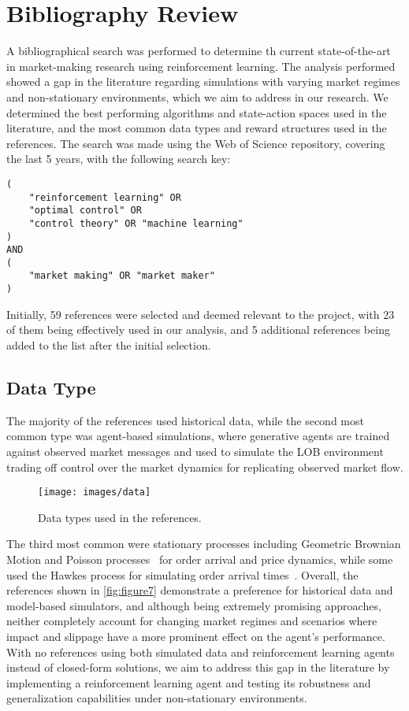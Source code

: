 \section{Bibliography Review}
\label{sec:bibliography-review}

A bibliographical search was performed to determine th current state-of-the-art in market-making research using reinforcement learning.
The analysis performed showed a gap in the literature regarding simulations with varying market regimes and non-stationary environments,
which we aim to address in our research.
We determined the best performing algorithms and state-action spaces used in the literature,
and the most common data types and reward structures used in the references.
The search was made using the Web of Science repository, covering the last 5 years, with the following search key:

\small
\begin{verbatim}
(
    "reinforcement learning" OR
    "optimal control" OR
    "control theory" OR "machine learning"
)
AND
(
    "market making" OR "market maker"
)
\end{verbatim}

Initially, 59 references were selected and deemed relevant to the project,
with 23 of them being effectively used in our analysis, and 5 additional references being added to the list after the initial selection.

\subsection{Data Type}
\label{subsec:data-type}
The majority of the references used historical data, while the second most common type was agent-based simulations,
where generative agents are trained against observed market messages and used to simulate the LOB environment~\cite{Frey2023, Ganesh2019}
trading off control over the market dynamics for replicating observed market flow.

\begin{figure}
    \centering
    \texttt{[image: images/data]}
    \caption{Data types used in the references.}
    \label{fig:figure7}
\end{figure}

The third most common were stationary processes including Geometric Brownian Motion and Poisson processes~\cite{Gasperov2021, Sun2022} for
order arrival and price dynamics, while some used the Hawkes process for simulating order arrival times~\cite{Jerome2022, Selser2021}.
Overall, the references shown in \autoref{fig:figure7} demonstrate a preference for historical data and model-based simulators,
and although being extremely promising approaches, neither completely account for changing market regimes and scenarios where impact and
slippage have a more prominent effect on the agent's performance.
With no references using both simulated data and reinforcement learning agents instead of closed-form solutions,
we aim to address this gap in the literature by implementing a reinforcement learning agent and testing its robustness and generalization capabilities under non-stationary environments.

